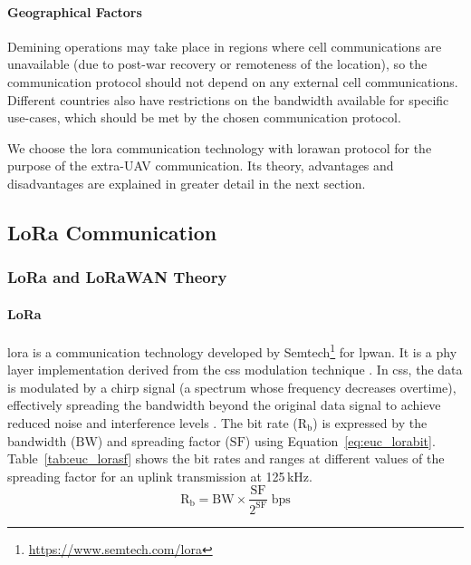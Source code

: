 \paragraph{Geographical Factors} Demining operations may take place in regions where cell communications are unavailable (due to post-war recovery or remoteness of the location), so the communication protocol should not depend on any external cell communications. Different countries also have restrictions on the bandwidth available for specific use-cases, which should be met by the chosen communication protocol. 

We choose the \gls{lora} communication technology with \gls{lorawan} protocol for the purpose of the extra-\gls{UAV} communication. Its theory, advantages and disadvantages are explained in greater detail in the next section. 

\subsection{LoRa Communication}
\label{sec:euc_lora}

\subsubsection{LoRa and LoRaWAN Theory}

\paragraph{LoRa} \gls{lora} is a communication technology developed by Semtech\footnote{\url{https://www.semtech.com/lora}} for \gls{lpwan}. It is a \gls{phy} layer implementation derived from the \gls{css} modulation technique \cite{semtech2024lora}. In \gls{css}, the data is modulated by a chirp signal (a spectrum whose frequency decreases overtime), effectively spreading the bandwidth beyond the original data signal to achieve reduced noise and interference levels \cite{devalal2018lora}. The bit rate ($\mathrm{R_b}$) is expressed by the bandwidth ($\mathrm{BW}$) and spreading factor ($\mathrm{SF}$) using Equation~\ref{eq:euc_lorabit}. Table~\ref{tab:euc_lorasf} shows the bit rates and ranges at different values of the spreading factor for an uplink transmission at 125\,kHz. 
\begin{equation} 
\label{eq:euc_lorabit}
\mathrm{R_b} = \mathrm{BW} \times \frac{\mathrm{SF}}{2^{\mathrm{SF}}} \; \mathrm{bps}
\end{equation}

